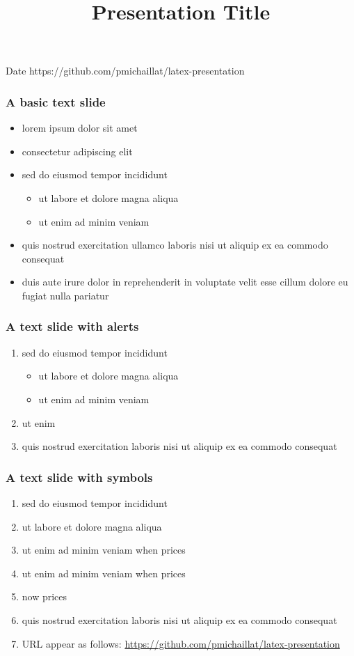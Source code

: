 \documentclass[12pt,xcolor={dvipsnames},hyperref={pdftex,pdfpagemode=UseNone,hidelinks,pdfdisplaydoctitle=true},usepdftitle=false]{beamer}
\begin{document}
\title{Presentation Title}
%
{Date}%
{https://github.com/pmichaillat/latex-presentation}
\frame[plain]{\titlepage}

\begin{frame}
\frametitle{A basic text slide}
\begin{itemize}
\item lorem ipsum dolor sit amet
\item consectetur adipiscing elit
\item sed do eiusmod tempor incididunt
\begin{itemize}
\item ut labore et dolore magna aliqua
\item ut enim ad minim veniam
\end{itemize}
\item quis nostrud exercitation ullamco laboris nisi ut aliquip ex ea commodo consequat
\item duis aute irure dolor in reprehenderit in voluptate velit esse cillum dolore eu fugiat nulla pariatur
\end{itemize}
\end{frame}

\begin{frame}
\frametitle{A text slide with alerts}
\begin{enumerate}
\item sed do eiusmod tempor incididunt
\begin{itemize}
\item ut labore et dolore magna aliqua
\item ut enim ad minim veniam
\end{itemize}
\item ut enim 
\item quis nostrud exercitation  laboris nisi ut aliquip ex ea commodo consequat
\end{enumerate}
\end{frame}

\begin{frame}
\frametitle{A text slide with symbols}
\begin{enumerate}
\item sed do eiusmod tempor \so incididunt
\item ut labore et dolore \then magna aliqua
\item ut enim ad minim veniam when prices \up
\item ut enim ad minim veniam when prices \down
\item now prices \flat 
\item quis nostrud exercitation laboris nisi ut aliquip \then ex ea commodo consequat
\item URL appear as follows: \url{https://github.com/pmichaillat/latex-presentation}
\end{enumerate}
\end{frame}
\end{document}
